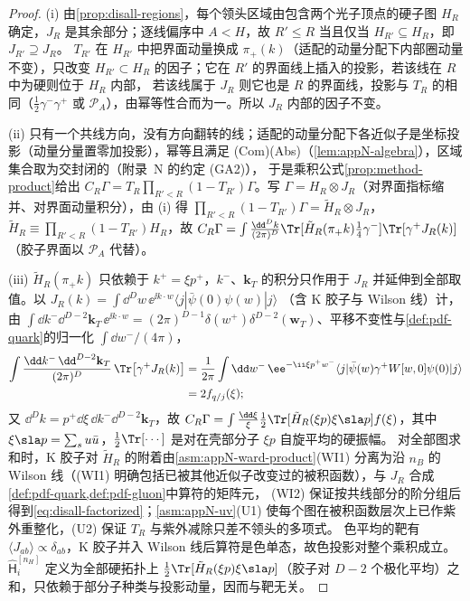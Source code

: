\begin{proof}
(i) 由\cref{prop:disall-regions}，每个领头区域由包含两个光子顶点的硬子图 $H_R$ 确定，$J_R$ 是其余部分；逐线偏序中 $A<H$，故 $R'\le R$ 当且仅当 $H_{R'}\subseteq H_R$，即 $J_{R'}\supseteq J_R$。
$T_{R'}$ 在 $H_{R'}$ 中把界面动量换成 $\pi_+(k)$（适配的动量分配下内部圈动量不变），只改变 $H_{R'}\subset H_R$ 的因子；它在 $R'$ 的界面线上插入的投影，若该线在 $R$ 中为硬则位于 $H_R$ 内部，
若该线属于 $J_R$ 则它也是 $R$ 的界面线，投影与 $T_R$ 的相同（$\frac12\gamma^-\gamma^+$ 或 $\mathcal P_A$），由幂等性合而为一。所以 $J_R$ 内部的因子不变。

(ii) 只有一个共线方向，没有方向翻转的线；适配的动量分配下各近似子是坐标投影（动量分量置零加投影），幂等且满足 (Com)(Abs)（\cref{lem:appN-algebra}），区域集合取为交封闭的（附录~N 的约定 (GA2)），
于是乘积公式\cref{prop:method-product}给出 $C_R\Gamma=T_R\prod_{R'<R}(1-T_{R'})\Gamma$。写 $\Gamma=H_R\otimes J_R$（对界面指标缩并、对界面动量积分），由 (i) 得 $\prod_{R'<R}(1-T_{R'})\Gamma=\tilde H_R\otimes J_R$，
$\tilde H_R\equiv\prod_{R'<R}(1-T_{R'})H_R$，故 $C_R\Gamma=\int\frac{\dd^Dk}{(2\pi)^D}\Tr[\tilde H_R(\pi_+k)\frac14\gamma^-]\Tr[\gamma^+J_R(k)]$（胶子界面以 $\mathcal P_A$ 代替）。

(iii) $\tilde H_R(\pi_+k)$ 只依赖于 $k^+=\xi p^+$，$k^-$、$\mathbf k_T$ 的积分只作用于 $J_R$ 并延伸到全部取值。以 $J_R(k)=\int\dd^Dw\,\ee^{\ii k\cdot w}\langle j|\bar\psi(0)\psi(w)|j\rangle$
（含 K 胶子与 Wilson 线）计，由 $\int\dd k^-\dd^{D-2}\mathbf k_T\,\ee^{\ii k\cdot w}=(2\pi)^{D-1}\delta(w^+)\delta^{D-2}(\mathbf w_T)$、平移不变性与\cref{def:pdf-quark}的归一化 $\int\dd w^-/(4\pi)$，
\begin{equation}\label{eq:disall-chain}
\begin{aligned}
\int\frac{\dd k^-\,\dd^{D-2}\mathbf k_T}{(2\pi)^D}\,\Tr\big[\gamma^+J_R(k)\big]
&=\frac1{2\pi}\int\dd w^-\,\ee^{-\ii\xi p^+w^-}\langle j|\bar\psi(w)\gamma^+W[w,0]\psi(0)|j\rangle\\
&=2f_{q/j}(\xi);
\end{aligned}
\end{equation}
又 $\dd^Dk=p^+\dd\xi\,\dd k^-\dd^{D-2}\mathbf k_T$，故 $C_R\Gamma=\int\frac{\dd\xi}{\xi}\frac12\Tr[\tilde H_R(\xi p)\xi\sla p]f(\xi)$，其中 $\xi\sla p=\sum_su\bar u$，$\frac12\Tr[\cdots]$ 是对在壳部分子 $\xi p$ 自旋平均的硬振幅。
对全部图求和时，K 胶子对 $\tilde H_R$ 的附着由\cref{asm:appN-ward-product}(WI1) 分离为沿 $n_B$ 的 Wilson 线（(WI1) 明确包括已被其他近似子改变过的被积函数），与 $J_R$ 合成\cref{def:pdf-quark,def:pdf-gluon}中算符的矩阵元，
(WI2) 保证按共线部分的阶分组后得到\cref{eq:disall-factorized}；\cref{asm:appN-uv}(U1) 使每个图在被积函数层次上已作紫外重整化，(U2) 保证 $T_R$ 与紫外减除只差不领头的多项式。
色平均的靶有 $\langle J_{ab}\rangle\propto\delta_{ab}$，K 胶子并入 Wilson 线后算符是色单态，故色投影对整个乘积成立。$\hat{\mathsf H}^{[n_H]}_i$ 定义为全部硬拓扑上 $\frac12\Tr[\tilde H_R(\xi p)\xi\sla p]$（胶子对 $D-2$ 个极化平均）之和，只依赖于部分子种类与投影动量，因而与靶无关。
\end{proof}

